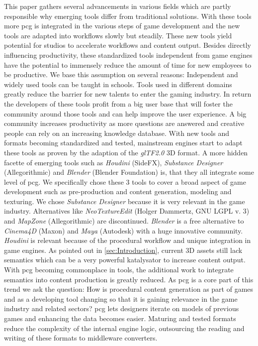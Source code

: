 \documentclass[10pt,a4paper]{article}
\begin{document}
\begin{multicols}{2}
This paper gathers several advancements in various fields which are partly responsible why emerging tools differ from traditional solutions. With these tools more \gls{pcg} is integrated in the various steps of game development and the new tools are adapted into workflows slowly but steadily. These new tools yield potential for studios to accelerate workflows and content output. Besides directly influencing productivity, these standardized tools independent from game engines have the potential to immensely reduce the amount of time for new employees to be productive. We base this assumption on several reasons: Independent and widely used tools can be taught in schools. Tools used in different domains greatly reduce the barrier for new talents to enter the gaming industry. In return the developers of these tools profit from a big user base that will foster the community around those tools and can help improve the user experience. A big community increases productivity as more questions are answered and creative people can rely on an increasing knowledge database. With new tools and formats becoming standardized and tested, mainstream engines start to adapt these tools as proven by the adaption of the \textit{glTF2.0} 3D format\cite{Group2018}. A more hidden facette of emerging tools such as \textit{Houdini} (SideFX), \textit{Substance Designer} (Allegorithmic) and \textit{Blender} (Blender Foundation) is, that they all integrate some level of \gls{pcg}. We specifically chose these 3 tools to cover a broad aspect of game development such as pre-production and content generation, modeling and texturing. We chose \textit{Substance Designer} because it is very relevant in the game industry. Alternatives like \textit{NeoTextureEdit} (Holger Dammertz, GNU LGPL v. 3) and \textit{MapZone} (Allegorithmic) are discontinued. \textit{Blender} is a free alternative to \textit{Cinema4D} (Maxon) and \textit{Maya} (Autodesk) with a huge innovative community. \textit{Houdini} is relevant because of the procedural workflow and unique integration in game engines. As pointed out in \autoref{sec:Introduction}, current 3D assets still lack semantics which can be a very powerful katalysator to increase content output. With \gls{pcg} becoming commonplace in tools, the additional work to integrate semantics into content production is greatly reduced. As \gls{pcg} is a core part of this trend we ask the question: How is procedural content generation as part of games and as a developing tool changing so that it is gaining relevance in the game industry and related sectors? \gls{pcg} lets designers iterate on models of previous games and enhancing the data becomes easier. Maturing and tested formats reduce the complexity of the internal engine logic, outsourcing the reading and writing of these formats to middleware converters.
\end{multicols}
\end{document}
